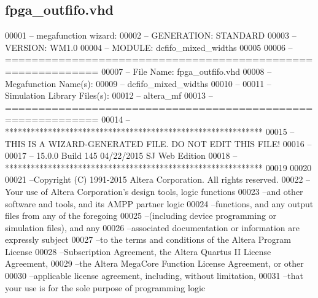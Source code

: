 \subsection{fpga\+\_\+outfifo.\+vhd}
\label{fpga__outfifo_8vhd_source}

\begin{DoxyCode}
00001 \textcolor{keyword}{-- megafunction wizard: %
00002 \textcolor{keyword}{-- GENERATION: STANDARD}
00003 \textcolor{keyword}{-- VERSION: WM1.0}
00004 \textcolor{keyword}{-- MODULE: dcfifo\_mixed\_widths }
00005 
00006 \textcolor{keyword}{-- ============================================================}
00007 \textcolor{keyword}{-- File Name: fpga\_outfifo.vhd}
00008 \textcolor{keyword}{-- Megafunction Name(s):}
00009 \textcolor{keyword}{--          dcfifo\_mixed\_widths}
00010 \textcolor{keyword}{--}
00011 \textcolor{keyword}{-- Simulation Library Files(s):}
00012 \textcolor{keyword}{--          altera\_mf}
00013 \textcolor{keyword}{-- ============================================================}
00014 \textcolor{keyword}{-- ************************************************************}
00015 \textcolor{keyword}{-- THIS IS A WIZARD-GENERATED FILE. DO NOT EDIT THIS FILE!}
00016 \textcolor{keyword}{--}
00017 \textcolor{keyword}{-- 15.0.0 Build 145 04/22/2015 SJ Web Edition}
00018 \textcolor{keyword}{-- ************************************************************}
00019 
00020 
00021 \textcolor{keyword}{--Copyright (C) 1991-2015 Altera Corporation. All rights reserved.}
00022 \textcolor{keyword}{--Your use of Altera Corporation's design tools, logic functions }
00023 \textcolor{keyword}{--and other software and tools, and its AMPP partner logic }
00024 \textcolor{keyword}{--functions, and any output files from any of the foregoing }
00025 \textcolor{keyword}{--(including device programming or simulation files), and any }
00026 \textcolor{keyword}{--associated documentation or information are expressly subject }
00027 \textcolor{keyword}{--to the terms and conditions of the Altera Program License }
00028 \textcolor{keyword}{--Subscription Agreement, the Altera Quartus II License Agreement,}
00029 \textcolor{keyword}{--the Altera MegaCore Function License Agreement, or other }
00030 \textcolor{keyword}{--applicable license agreement, including, without limitation, }
00031 \textcolor{keyword}{--that your use is for the sole purpose of programming logic }
}
\end{DoxyCode}
